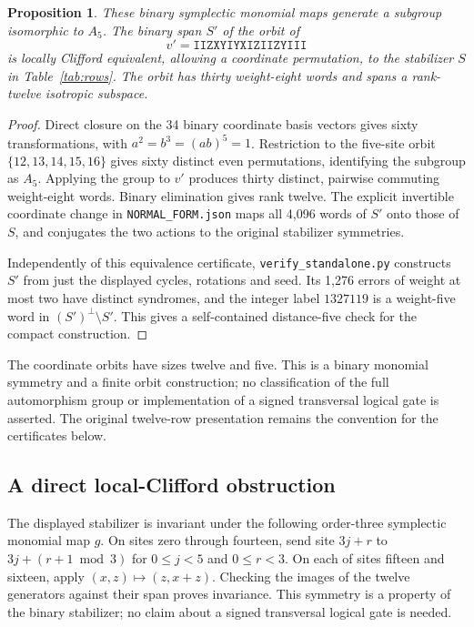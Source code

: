 \documentclass[11pt]{article}
\newtheorem{proposition}[theorem]{Proposition}
\begin{document}
\begin{proposition}\label{prop:a5}
These binary symplectic monomial maps generate a subgroup isomorphic to $A_5$. The binary span $S'$ of the orbit of
\[
 v'=\texttt{IIZXYIYXIZIIZYIII}
\]
is locally Clifford equivalent, allowing a coordinate permutation, to the stabilizer $S$ in Table~\ref{tab:rows}. The orbit has thirty weight-eight words and spans a rank-twelve isotropic subspace.
\end{proposition}
\begin{proof}
Direct closure on the 34 binary coordinate basis vectors gives sixty transformations, with $a^2=b^3=(ab)^5=1$. Restriction to the five-site orbit $\{12,13,14,15,16\}$ gives sixty distinct even permutations, identifying the subgroup as $A_5$. Applying the group to $v'$ produces thirty distinct, pairwise commuting weight-eight words. Binary elimination gives rank twelve. The explicit invertible coordinate change in \texttt{NORMAL\_FORM.json} maps all 4,096 words of $S'$ onto those of $S$, and conjugates the two actions to the original stabilizer symmetries.

Independently of this equivalence certificate, \texttt{verify\_standalone.py} constructs $S'$ from just the displayed cycles, rotations and seed. Its 1,276 errors of weight at most two have distinct syndromes, and the integer label $1327119$ is a weight-five word in $(S')^\perp\setminus S'$. This gives a self-contained distance-five check for the compact construction.
\end{proof}
The coordinate orbits have sizes twelve and five. This is a binary monomial symmetry and a finite orbit construction; no classification of the full automorphism group or implementation of a signed transversal logical gate is asserted. The original twelve-row presentation remains the convention for the certificates below.

\subsection{A direct local-Clifford obstruction}

The displayed stabilizer is invariant under the following order-three symplectic monomial map $g$. On sites zero through fourteen, send site $3j+r$ to $3j+(r+1\bmod 3)$ for $0\le j<5$ and $0\le r<3$. On each of sites fifteen and sixteen, apply $(x,z)\mapsto(z,x+z)$. Checking the images of the twelve generators against their span proves invariance. This symmetry is a property of the binary stabilizer; no claim about a signed transversal logical gate is needed.
\end{document}
